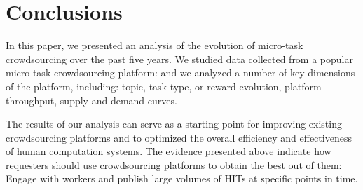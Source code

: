 \section{Conclusions}\label{sec:conc}

In this paper, we presented an analysis of the evolution of micro-task crowdsourcing over the past five years.
We studied data collected from a popular micro-task crowdsourcing platform: \amt{}
and we analyzed a number of key dimensions of the platform, including: topic, task type, or reward evolution, platform throughput, supply and demand curves.

The results of our analysis can serve as a starting point for improving existing crowdsourcing platforms and to optimized the overall efficiency and effectiveness of human computation systems. The evidence presented above  indicate how requesters should use crowdsourcing platforms to obtain the best out of them: Engage with workers and publish large volumes of HITs at specific points in time. 

